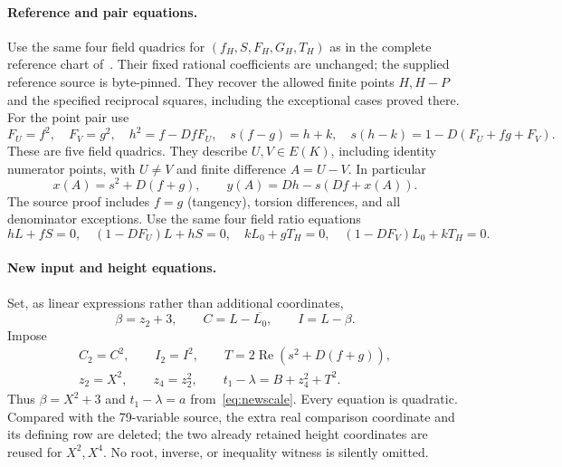 \documentclass[11pt,a4paper]{article}
\theoremstyle{remark}\newtheorem{remark}[theorem]{Remark}
\begin{document}
\paragraph{Reference and pair equations.}
Use the same four field quadrics for $(f_H,S,F_H,G_H,T_H)$ as in the
complete reference chart of~\cite{Parent,Reference}. Their fixed
rational coefficients are unchanged; the supplied reference source is
byte-pinned. They recover the allowed finite points $H,H-P$ and the
specified reciprocal squares, including the exceptional cases proved
there. For the point pair use
\begin{equation}\label{eq:pair}
 F_U=f^2,\quad F_V=g^2,\quad h^2=f-DfF_U,\quad
 s(f-g)=h+k,\quad s(h-k)=1-D(F_U+fg+F_V).
\end{equation}
These are five field quadrics. They describe $U,V\in E(K)$, including
identity numerator points, with $U\ne V$ and finite difference $A=U-V$.
In particular
\[
 x(A)=s^2+D(f+g),\qquad y(A)=Dh-s(Df+x(A)).
\]
The source proof includes $f=g$ (tangency), torsion differences, and
all denominator exceptions. Use the same four field ratio equations
\begin{equation}\label{eq:ratios}
 hL+fS=0,\quad(1-DF_U)L+hS=0,\quad
 kL_0+gT_H=0,\quad(1-DF_V)L_0+kT_H=0.
\end{equation}

\paragraph{New input and height equations.}
Set, as linear expressions rather than additional coordinates,
\[
 \beta=z_2+3,\qquad C=L-\overline{L_0},\qquad I=L-\beta.
\]
Impose
\begin{equation}\label{eq:newrows}
 \begin{gathered}
 C_2=C^2,\qquad I_2=I^2,\qquad
 T=2\operatorname{Re}(s^2+D(f+g)),\\
 z_2=X^2,\qquad z_4=z_2^2,\qquad
 t_1-\lambda=B+z_4^2+T^2.
 \end{gathered}
\end{equation}
Thus $\beta=X^2+3$ and $t_1-\lambda=a$ from~\eqref{eq:newscale}.
Every equation is quadratic. Compared with the 79-variable source,
the extra real comparison coordinate and its defining row are deleted;
the two already retained height coordinates are reused for $X^2,X^4$.
No root, inverse, or inequality witness is silently omitted.
\end{document}
